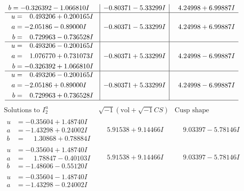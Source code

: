 \documentclass[1p]{elsarticle_modified}
\theoremstyle{definition}
\newcommand{\I}{\sqrt{-1}}
\begin{document}
$$\begin{array}{c|c|c}
\begin{aligned}
b &= -0.326392 - 1.066810 I\end{aligned}
 & -0.80371 - 5.33299 I & \phantom{-}4.24998 + 6.99887 I \\ \hline\begin{aligned}
u &= \phantom{-}0.493206 + 0.200165 I \\
a &= -2.05186 - 0.89000 I \\
b &= \phantom{-}0.729963 - 0.736528 I\end{aligned}
 & -0.80371 - 5.33299 I & \phantom{-}4.24998 + 6.99887 I \\ \hline\begin{aligned}
u &= \phantom{-}0.493206 - 0.200165 I \\
a &= \phantom{-}1.076770 + 0.731073 I \\
b &= -0.326392 + 1.066810 I\end{aligned}
 & -0.80371 + 5.33299 I & \phantom{-}4.24998 - 6.99887 I \\ \hline\begin{aligned}
u &= \phantom{-}0.493206 - 0.200165 I \\
a &= -2.05186 + 0.89000 I \\
b &= \phantom{-}0.729963 + 0.736528 I\end{aligned}
 & -0.80371 + 5.33299 I & \phantom{-}4.24998 - 6.99887 I\\
 \hline 
 \end{array}$$\newpage$$\begin{array}{c|c|c}  
\text{Solutions to }I^u_{2}& \I (\text{vol} + \sqrt{-1}CS) & \text{Cusp shape}\\
 \hline 
\begin{aligned}
u &= -0.35604 + 1.48740 I \\
a &= -1.43298 + 0.24002 I \\
b &= \phantom{-}1.30868 + 0.78884 I\end{aligned}
 & \phantom{-}5.91538 + 9.14466 I & \phantom{-}9.03397 - 5.78146 I \\ \hline\begin{aligned}
u &= -0.35604 + 1.48740 I \\
a &= \phantom{-}1.78847 - 0.40103 I \\
b &= -1.48606 - 0.55120 I\end{aligned}
 & \phantom{-}5.91538 + 9.14466 I & \phantom{-}9.03397 - 5.78146 I \\ \hline\begin{aligned}
u &= -0.35604 - 1.48740 I \\
a &= -1.43298 - 0.24002 I \\

\end{aligned}
\end{array}$$
\end{document}
